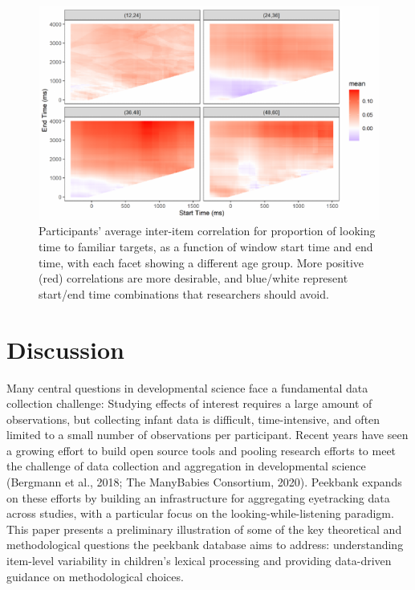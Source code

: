 \documentclass[10pt, letterpaper]{article}
\newenvironment{CodeChunk}{}{}
\begin{document}
\begin{CodeChunk}
\begin{figure}[h]

{\centering \includegraphics{figs/time_window-1}

}

\caption[Participants' average inter-item correlation for proportion of looking time to familiar targets, as a function of window start time and end time, with each facet showing a different age group]{Participants' average inter-item correlation for proportion of looking time to familiar targets, as a function of window start time and end time, with each facet showing a different age group. More positive (red) correlations are more desirable, and blue/white represent start/end time combinations that researchers should avoid.}\label{fig:time_window}
\end{figure}
\end{CodeChunk}

\hypertarget{discussion}{%
\section{Discussion}\label{discussion}}

Many central questions in developmental science face a fundamental data
collection challenge: Studying effects of interest requires a large
amount of observations, but collecting infant data is difficult,
time-intensive, and often limited to a small number of observations per
participant. Recent years have seen a growing effort to build open
source tools and pooling research efforts to meet the challenge of data
collection and aggregation in developmental science (Bergmann et al.,
2018; The ManyBabies Consortium, 2020). Peekbank expands on these
efforts by building an infrastructure for aggregating eyetracking data
across studies, with a particular focus on the looking-while-listening
paradigm. This paper presents a preliminary illustration of some of the
key theoretical and methodological questions the peekbank database aims
to address: understanding item-level variability in children's lexical
processing and providing data-driven guidance on methodological choices.
\end{document}
